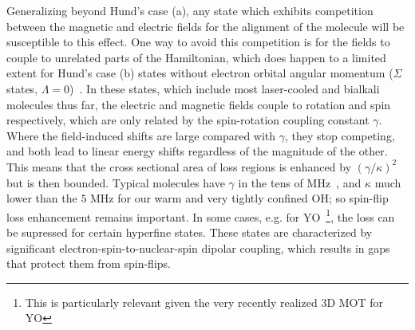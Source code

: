 \documentclass[%
 reprint,
 amsmath,amssymb,
 aps,
prl,
]{revtex4-1}
\newcommand{\red}[1]{{\color{black} #1}}
\begin{document}
Generalizing beyond Hund's case (a), any state which exhibits competition between the magnetic and electric fields for the alignment of the molecule will be susceptible to this effect. One way to avoid this competition is for the fields to couple to unrelated parts of the Hamiltonian, which does happen to a limited extent for Hund's case (b) states without electron orbital angular momentum ($\Sigma$ states, $\Lambda=0$)~\cite{Bohn2013}. In these states, which include most laser-cooled and bialkali molecules thus far, the electric and magnetic fields couple to rotation and spin respectively, which are only related by the spin-rotation coupling constant $\gamma$. Where the field-induced shifts are large compared with $\gamma$, they stop competing, and both lead to linear energy shifts regardless of the magnitude of the other. This means that the cross sectional area of loss regions is enhanced by $(\gamma/\kappa)^2$ but is then bounded. Typical molecules have $\gamma$ in the tens of MHz~\cite{Quemener2016}, and $\kappa$ much lower than the $5\text{ MHz}$ for our warm and very tightly confined OH; so spin-flip loss enhancement remains important. \red{In some cases, e.g. for YO~\footnote{This is particularly relevant given the very recently realized 3D MOT for YO}, the loss can be supressed for certain hyperfine states. These states are characterized by significant  electron-spin-to-nuclear-spin dipolar coupling, which results in gaps that protect them from spin-flips.}


\end{document}
